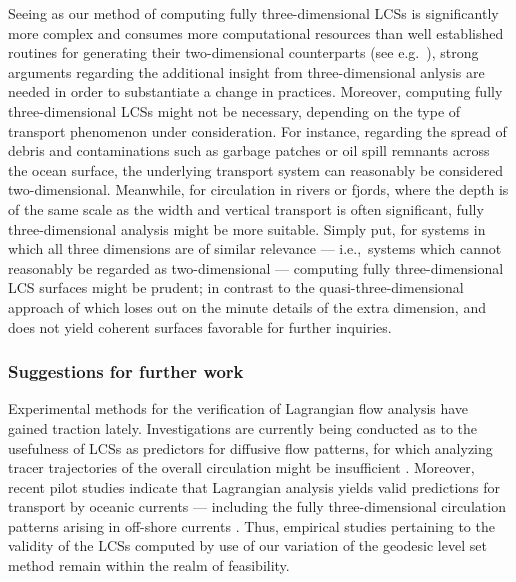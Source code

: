 Seeing as our method of computing fully three-dimensional LCSs is significantly
more complex and consumes more computational resources than well established
routines for generating their two-dimensional counterparts (see e.g.\
\textcite{onu2015lcstool}), strong arguments regarding the additional insight
from three-dimensional anlysis are needed in order to substantiate a change in
practices. Moreover, computing fully three-dimensional LCSs might not be
necessary, depending on the type of transport phenomenon under consideration.
For instance, regarding the spread of debris and contaminations such as garbage
patches or oil spill remnants across the ocean surface, the underlying
transport system can reasonably be considered two-dimensional. Meanwhile, for
circulation in rivers or fjords, where the depth is of the same scale as the
width and vertical transport is often significant, fully three-dimensional
analysis might be more suitable. Simply put, for systems in which all three
dimensions are of similar relevance --- i.e.,\ systems which cannot reasonably
be regarded as two-dimensional --- computing fully three-dimensional LCS
surfaces might be prudent; in contrast to the quasi-three-dimensional approach
of \textcite{blazevski2014hyperbolic} which loses out on the minute details
of the extra dimension, and does not yield coherent surfaces favorable for
further inquiries.

\subsubsection{Suggestions for further work}
\label{ssub:suggestions_for_further_work}
Experimental methods for the verification of Lagrangian flow analysis have
gained traction lately. Investigations are currently being conducted as to the
usefulness of LCSs as predictors for diffusive flow patterns, for which
analyzing tracer trajectories of the overall circulation might be insufficient
\parencite{haller2018material}. Moreover, recent pilot studies indicate that
Lagrangian analysis yields valid predictions for transport by oceanic currents
\parencite{filippi2018detection} --- including the fully three-dimensional
circulation patterns arising in off-shore currents
\parencite{peacock2018targeted}. Thus, empirical studies pertaining to the
validity of the LCSs computed by use of our variation of the geodesic level set
method remain within the realm of feasibility.

